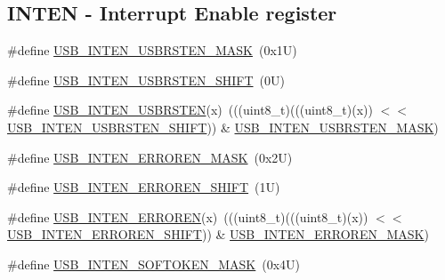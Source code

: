 \subsection*{I\+N\+T\+EN -\/ Interrupt Enable register}
\begin{DoxyCompactItemize}
\item 
\#define \mbox{\hyperlink{group___u_s_b___register___masks_ga67ed1b19b1fe4e25fc5ccf7bf0d42c38}{U\+S\+B\+\_\+\+I\+N\+T\+E\+N\+\_\+\+U\+S\+B\+R\+S\+T\+E\+N\+\_\+\+M\+A\+SK}}~(0x1\+U)
\item 
\#define \mbox{\hyperlink{group___u_s_b___register___masks_gaf3b53207fe24da42d123d8e94494b72f}{U\+S\+B\+\_\+\+I\+N\+T\+E\+N\+\_\+\+U\+S\+B\+R\+S\+T\+E\+N\+\_\+\+S\+H\+I\+FT}}~(0\+U)
\item 
\#define \mbox{\hyperlink{group___u_s_b___register___masks_ga9adae8276677c093c8b86f2198ae27bb}{U\+S\+B\+\_\+\+I\+N\+T\+E\+N\+\_\+\+U\+S\+B\+R\+S\+T\+EN}}(x)~(((uint8\+\_\+t)(((uint8\+\_\+t)(x)) $<$$<$ \mbox{\hyperlink{group___u_s_b___register___masks_gaf3b53207fe24da42d123d8e94494b72f}{U\+S\+B\+\_\+\+I\+N\+T\+E\+N\+\_\+\+U\+S\+B\+R\+S\+T\+E\+N\+\_\+\+S\+H\+I\+FT}})) \& \mbox{\hyperlink{group___u_s_b___register___masks_ga67ed1b19b1fe4e25fc5ccf7bf0d42c38}{U\+S\+B\+\_\+\+I\+N\+T\+E\+N\+\_\+\+U\+S\+B\+R\+S\+T\+E\+N\+\_\+\+M\+A\+SK}})
\item 
\#define \mbox{\hyperlink{group___u_s_b___register___masks_gaf660b76755baff6ed122be3eba21723b}{U\+S\+B\+\_\+\+I\+N\+T\+E\+N\+\_\+\+E\+R\+R\+O\+R\+E\+N\+\_\+\+M\+A\+SK}}~(0x2\+U)
\item 
\#define \mbox{\hyperlink{group___u_s_b___register___masks_ga38c74121b3660065935c4f639f987b3c}{U\+S\+B\+\_\+\+I\+N\+T\+E\+N\+\_\+\+E\+R\+R\+O\+R\+E\+N\+\_\+\+S\+H\+I\+FT}}~(1\+U)
\item 
\#define \mbox{\hyperlink{group___u_s_b___register___masks_ga0d5944dbfdce653f192a20b6664ebcba}{U\+S\+B\+\_\+\+I\+N\+T\+E\+N\+\_\+\+E\+R\+R\+O\+R\+EN}}(x)~(((uint8\+\_\+t)(((uint8\+\_\+t)(x)) $<$$<$ \mbox{\hyperlink{group___u_s_b___register___masks_ga38c74121b3660065935c4f639f987b3c}{U\+S\+B\+\_\+\+I\+N\+T\+E\+N\+\_\+\+E\+R\+R\+O\+R\+E\+N\+\_\+\+S\+H\+I\+FT}})) \& \mbox{\hyperlink{group___u_s_b___register___masks_gaf660b76755baff6ed122be3eba21723b}{U\+S\+B\+\_\+\+I\+N\+T\+E\+N\+\_\+\+E\+R\+R\+O\+R\+E\+N\+\_\+\+M\+A\+SK}})
\item 
\#define \mbox{\hyperlink{group___u_s_b___register___masks_ga6398aff7e3278bea66900a35b616563f}{U\+S\+B\+\_\+\+I\+N\+T\+E\+N\+\_\+\+S\+O\+F\+T\+O\+K\+E\+N\+\_\+\+M\+A\+SK}}~(0x4\+U)
\item 

\end{DoxyCompactItemize}
